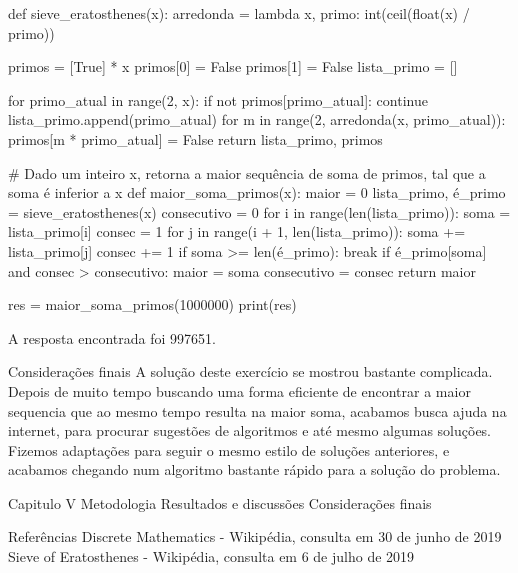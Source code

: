             def sieve_eratosthenes(x):
                arredonda = lambda x, primo: int(ceil(float(x) / primo))

                primos = [True] * x
                primos[0] = False
                primos[1] = False
                lista_primo = []

                for primo_atual in range(2, x):
                    if not primos[primo_atual]:
                        continue
                    lista_primo.append(primo_atual)
                    for m in range(2, arredonda(x, primo_atual)):
                        primos[m * primo_atual] = False
                return lista_primo, primos

            # Dado um inteiro x, retorna a maior sequência de soma de primos, tal que a soma é inferior a x
            def maior_soma_primos(x):
                maior = 0
                lista_primo, é_primo = sieve_eratosthenes(x)
                consecutivo = 0
                for i in range(len(lista_primo)):
                    soma = lista_primo[i]
                    consec = 1
                    for j in range(i + 1, len(lista_primo)):
                        soma += lista_primo[j]
                        consec += 1
                        if soma >= len(é_primo):
                            break
                        if é_primo[soma] and consec > consecutivo:
                            maior = soma
                            consecutivo = consec
                return maior

            res = maior_soma_primos(1000000)
            print(res)

            A resposta encontrada foi 997651.

        Considerações finais
            A solução deste exercício se mostrou bastante complicada. Depois de muito tempo buscando uma forma eficiente de encontrar a maior sequencia que ao mesmo tempo resulta na maior soma, acabamos busca ajuda na internet, para procurar sugestões de algoritmos e até mesmo algumas soluções. Fizemos adaptações para seguir o mesmo estilo de soluções anteriores, e acabamos chegando num algoritmo bastante rápido para a solução do problema.

Capitulo V
    Metodologia
    Resultados e discussões
    Considerações finais

Referências
    Discrete Mathematics - Wikipédia, consulta em 30 de junho de 2019
    Sieve of Eratosthenes - Wikipédia, consulta em 6 de julho de 2019